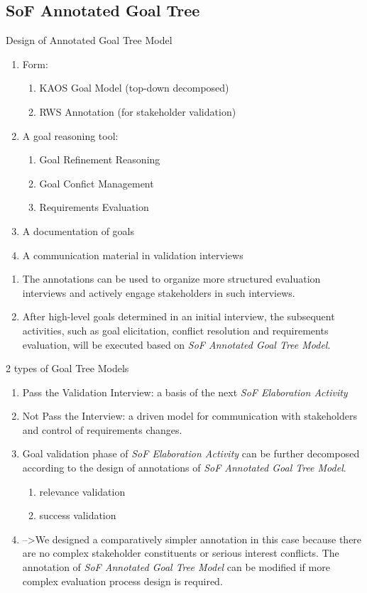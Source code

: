 \documentclass{beamer}
\begin{document}
\subsection{SoF Annotated Goal Tree}
\begin{frame}{Design of Annotated Goal Tree Model}
  \begin{enumerate}
  \item Form:
    \begin{enumerate}
    \item KAOS Goal Model  (top-down decomposed)
    \item RWS Annotation  (for stakeholder validation)
    \end{enumerate}
  \item A goal reasoning tool: 
    \begin{enumerate}
    \item Goal Refinement Reasoning
    \item Goal Confict Management
    \item Requirements Evaluation
    \end{enumerate}
  \item A documentation of goals
  \item A communication material in validation interviews
  \end{enumerate}
  \begin{enumerate}
  \item   The annotations can be used to organize more structured evaluation interviews and actively engage stakeholders in such interviews.
  \item   After high-level goals determined in an initial interview, the subsequent activities, such as goal elicitation, conflict resolution and requirements evaluation, will be executed based on \emph{SoF Annotated Goal Tree Model}.
  \end{enumerate}
\end{frame}  
\begin{frame}{2 types of Goal Tree Models}
  \begin{enumerate}
  \item Pass the Validation Interview: a basis of the next \emph{SoF Elaboration Activity}
  \item Not Pass the Interview: a driven model for communication with stakeholders and control of requirements changes.
  \item Goal validation phase of \emph{SoF Elaboration Activity} can be further decomposed according to the design of annotations of \emph{SoF Annotated Goal Tree Model}.
    \begin{enumerate}
    \item relevance validation
    \item success validation
    \end{enumerate}
  \item
   -->We designed a comparatively simpler annotation in this case because there are no complex stakeholder constituents or serious interest conflicts. The annotation of \emph{SoF Annotated Goal Tree Model} can be modified if more complex evaluation process design is required.
  \end{enumerate}
\end{frame}
\end{document}
